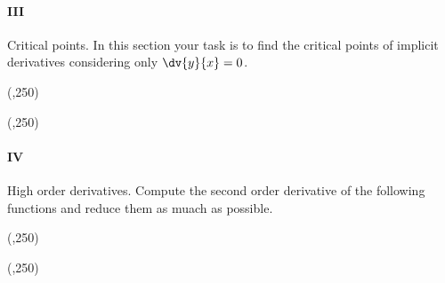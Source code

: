 \newpage

\paragraph{III} Critical points.
In this section your task is to find the critical points of implicit derivatives considering only \(\dv{y}{x}=0\).

\begin{preguntas}


\begin{center}
    \framebox(\textwidth,250){} 
\end{center}


\begin{center}
    \framebox(\textwidth,250){} 
\end{center}

\newpage 

\paragraph{IV} High order derivatives.
Compute the second order derivative of the following functions and reduce them as muach as possible.


\begin{center}
    \framebox(\textwidth,250){} 
\end{center}


\begin{center}
    \framebox(\textwidth,250){} 
\end{center}



\end{preguntas}

